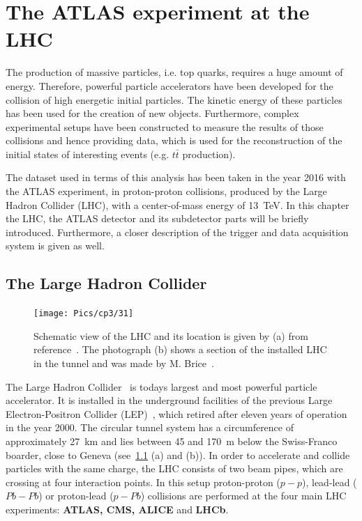 \chapter{The ATLAS experiment at the LHC}\label{ch3}

The production of massive particles, i.e. top quarks, requires a huge amount of energy. 
Therefore, powerful particle accelerators have been developed for the collision of high energetic initial particles. The kinetic energy of these particles has been used for the creation of new objects. Furthermore, complex experimental setups have been constructed to measure the results of those collisions and hence providing data, which is used for the reconstruction of the initial states of interesting events (e.g. $t\bar{t}$ production).

 The dataset used in terms of this analysis has been taken in the year 2016 with the ATLAS experiment, in proton-proton collisions, produced by the Large Hadron Collider (LHC), with a center-of-mass energy of 13~TeV. In this chapter the LHC, the ATLAS detector and its subdetector parts will be briefly introduced. Furthermore, a closer description of the trigger and data acquisition system is given as well. 




\section{The Large Hadron Collider}\label{LHC}
\vspace{0.5cm}
\begin{figure}[h]
\centering
\texttt{[image: Pics/cp3/31]}
\caption{Schematic view of the LHC and its location is given by (a) from reference~\cite{Bruning:2012zz}. The photograph (b) shows a section of the installed LHC in the  tunnel and was made by M. Brice~\cite{Brice:2221112}. }
\label{fig:31}
\end{figure}

 The Large Hadron Collider~\cite{Bruning:2012zz,Bruning:2004ej,Evans:2008zzb} is todays largest and most powerful particle accelerator. It is installed in the underground facilities of the previous Large Electron-Positron Collider (LEP)~\cite{LEP}, which retired after eleven years of operation in the year 2000. The circular tunnel system has a circumference of approximately 27~km and lies between 45 and 170~m below the Swiss-Franco boarder, close to Geneva (see~\cref{fig:31} (a) and (b)). In order to accelerate and collide particles with the same charge, the LHC consists of two beam pipes, which are crossing at four interaction points. In this setup proton-proton ($p-p$), lead-lead ($Pb-Pb$) or proton-lead ($p-Pb$) collisions are performed at the four main LHC experiments: \textbf{ATLAS, CMS, ALICE} and \textbf{LHCb}.

